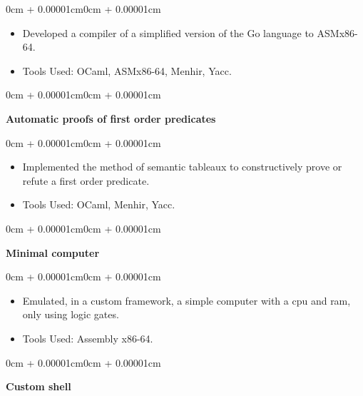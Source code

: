 \documentclass[10pt, letterpaper]{article}
\newenvironment{highlights}{
    \begin{itemize}[
        topsep=0.10cm,
        parsep=0.10cm,
        partopsep=0pt,
        itemsep=0pt,
        leftmargin=0cm + 10pt
    ]
}{
    \end{itemize}
}
\newenvironment{onecolentry}{
    \begin{adjustwidth}{0cm + 0.00001cm}{0cm + 0.00001cm}
}{
    \end{adjustwidth}
}
\begin{document}
\vspace{0.10cm}
\begin{onecolentry}
    \begin{highlights}
        \item Developed a compiler of a simplified version of the Go language to ASMx86-64.
        \item Tools Used: OCaml, ASMx86-64, Menhir, Yacc.
    \end{highlights}
\end{onecolentry}

\vspace{0.2cm}

\begin{onecolentry}
    \textbf{Automatic proofs of first order predicates}
\end{onecolentry}

\vspace{0.10cm}
\begin{onecolentry}
    \begin{highlights}
        \item Implemented the method of semantic tableaux to constructively prove or refute a first order predicate.
        \item Tools Used: OCaml, Menhir, Yacc.
    \end{highlights}
\end{onecolentry}

\vspace{0.2cm}

\begin{onecolentry}
    \textbf{Minimal computer}
\end{onecolentry}

\vspace{0.10cm}
\begin{onecolentry}
    \begin{highlights}
        \item Emulated, in a custom framework, a simple computer with a cpu and ram, only using logic gates.
        \item Tools Used: Assembly x86-64.
    \end{highlights}
\end{onecolentry}

\vspace{0.2cm}

\begin{onecolentry}
    \textbf{Custom shell}
\end{onecolentry}
\end{document}

